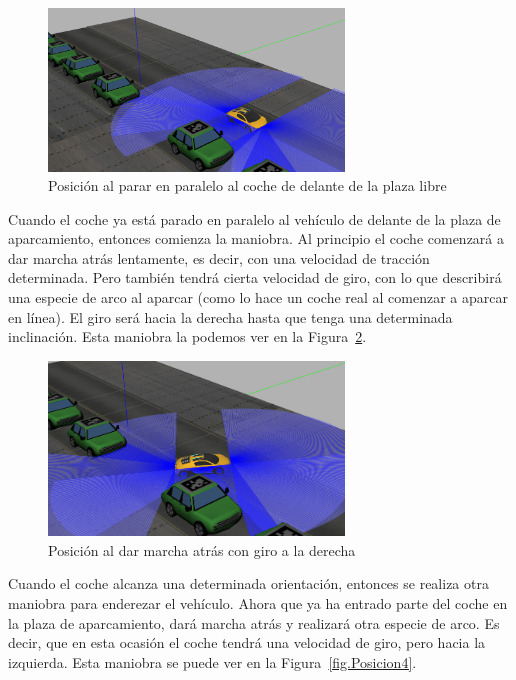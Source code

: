 \begin{figure}[H]
  \begin{center}
    \includegraphics[width=0.7\textwidth]{figures/Autopark/Posicion2.png}
		\caption{Posición al parar en paralelo al coche de delante de la plaza libre}
		\label{fig.Posicion2}
		\end{center}
\end{figure}

Cuando el coche ya está parado en paralelo al vehículo de delante de la plaza de aparcamiento, entonces comienza la maniobra. Al principio el coche comenzará a dar marcha atrás lentamente, es decir, con una velocidad de tracción determinada. Pero también tendrá cierta velocidad de giro, con lo que describirá una especie de arco al aparcar (como lo hace un coche real al comenzar a aparcar en línea). El giro será hacia la derecha hasta que tenga una determinada inclinación. Esta maniobra la podemos ver en la Figura~\ref{fig.Posicion3}.

\begin{figure}[H]
  \begin{center}
    \includegraphics[width=0.7\textwidth]{figures/Autopark/Posicion3.png}
		\caption{Posición al dar marcha atrás con giro a la derecha}
		\label{fig.Posicion3}
		\end{center}
\end{figure}

Cuando el coche alcanza una determinada orientación, entonces se realiza otra maniobra para enderezar el vehículo. Ahora que ya ha entrado parte del coche en la plaza de aparcamiento, dará marcha atrás y realizará otra especie de arco. Es decir, que en esta ocasión el coche tendrá una velocidad de giro, pero hacia la izquierda. Esta maniobra se puede ver en la Figura~\ref{fig.Posicion4}.

